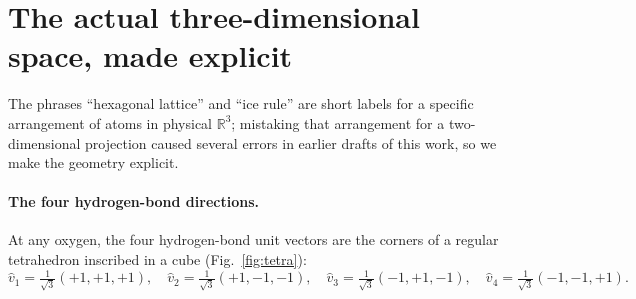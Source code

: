 \documentclass[final]{siamltex}
\newcommand{\R}{\mathbb{R}}
\begin{document}
\section{The actual three-dimensional space, made explicit}
\label{sec:space}

The phrases ``hexagonal lattice'' and ``ice rule'' are short labels
for a specific arrangement of atoms in physical
$\R^3$; mistaking that arrangement for a two-dimensional projection
caused several errors in earlier drafts of this work, so we make
the geometry explicit.

\paragraph{The four hydrogen-bond directions.}  At any oxygen, the
four hydrogen-bond unit vectors are the corners of a regular
tetrahedron inscribed in a cube (Fig.~\ref{fig:tetra}):
\begin{equation}\label{eq:tetra}
\hat{v}_1 = \tfrac{1}{\sqrt{3}}(+1,+1,+1), \quad
\hat{v}_2 = \tfrac{1}{\sqrt{3}}(+1,-1,-1), \quad
\hat{v}_3 = \tfrac{1}{\sqrt{3}}(-1,+1,-1), \quad
\hat{v}_4 = \tfrac{1}{\sqrt{3}}(-1,-1,+1).
\end{equation}
\end{document}
